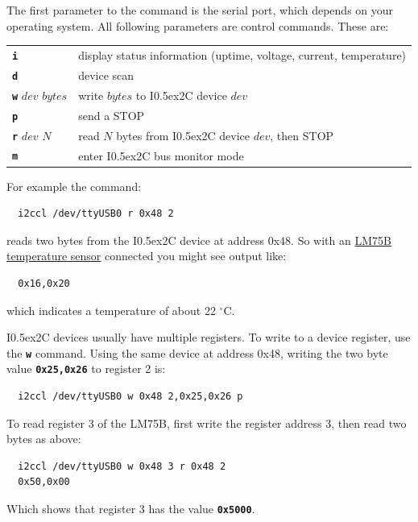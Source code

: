 \documentclass{article}
\newcommand{\two}{\raise0.5ex\hbox{\footnotesize{2}}}
\newcommand{\iic}{I\two{}C}
\newcommand{\degc}{$^{\circ}$C}
\newcommand{\mach}[1]{\texttt{\textbf{#1}}}
\newcommand{\gap}{\vspace{10pt}}
\begin{document}
The first parameter to the command is the serial port, which depends on your operating system.
All following parameters are control commands. These are:

\begin{tabular}{ll}
  \mach{i}               & display status information (uptime, voltage, current, temperature) \\
  \mach{d}               & device scan \index{bus scan} \\
  \mach{w} $dev$ $bytes$ & write $bytes$ to \iic{} device $dev$ \\
  \mach{p}               & send a STOP \\
  \mach{r} $dev$ $N$     & read $N$ bytes from \iic{} device $dev$, then STOP \\
  \mach{m}               & enter \iic{} bus monitor mode \\
\end{tabular}\gap

For example the command:

\begin{lstlisting}
  i2ccl /dev/ttyUSB0 r 0x48 2
\end{lstlisting}

reads two bytes from the \iic{} device at address 0x48.
So with an
\href{https://www.nxp.com/docs/en/data-sheet/LM75B.pdf}{LM75B temperature sensor}
connected you might see output like:

\begin{lstlisting}
  0x16,0x20
\end{lstlisting}

which indicates a temperature of about 22 \degc.

\iic{} devices usually have multiple registers. To write to a device register,
use the \mach{w} command.
Using the same device at address 0x48, writing the two byte value \mach{0x25,0x26} to register 2 is:

\begin{lstlisting}
  i2ccl /dev/ttyUSB0 w 0x48 2,0x25,0x26 p
\end{lstlisting}

To read register 3 of the LM75B, first write the register address 3, then read two bytes as above:

\begin{lstlisting}
  i2ccl /dev/ttyUSB0 w 0x48 3 r 0x48 2
  0x50,0x00
\end{lstlisting}

Which shows that register 3 has the value \mach{0x5000}.
\end{document}
